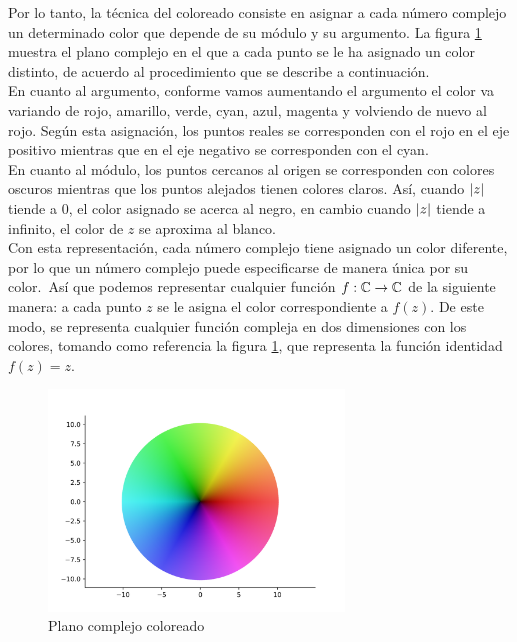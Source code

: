 Por lo tanto, la técnica del coloreado consiste en asignar a cada número complejo un determinado color que depende de su módulo y su argumento. La figura \ref{fig:z} muestra el plano complejo en el que a cada punto se le ha asignado un color distinto, de acuerdo al procedimiento que se describe a continuación. \\

En cuanto al argumento, conforme vamos aumentando el argumento el color va variando de rojo, amarillo, verde, cyan, azul, magenta y volviendo de nuevo al rojo. Según esta asignación, los puntos reales se corresponden con el rojo en el eje positivo mientras que en el eje negativo se corresponden con el cyan. \\

En cuanto al módulo, los puntos cercanos al origen se corresponden con colores oscuros mientras que los puntos alejados tienen colores claros. Así, cuando $\left\lvert z\right\rvert$ tiende a $0$, el color asignado se acerca al negro, en cambio cuando $\left\lvert z\right\rvert$ tiende a infinito, el color de $z$ se aproxima al blanco. \\

Con esta representación, cada número complejo tiene asignado un color diferente, por lo que un número complejo puede especificarse de manera única por su color. Así que podemos representar cualquier función $f : \mathbb{C} \to \mathbb{C}$ de la siguiente manera: a cada punto $z$ se le asigna el color correspondiente a $f(z)$. De este modo, se representa cualquier función compleja en dos dimensiones con los colores, tomando como referencia la figura \ref{fig:z}, que representa la función identidad $f(z) = z$. \\

\begin{figure}[!htbp]
    \centering
    \includegraphics[width=0.7\textwidth]{../Aplicacion/z.png}
    \caption{Plano complejo coloreado}
    \label{fig:z}
\end{figure}

